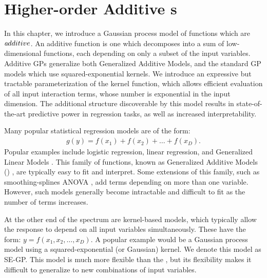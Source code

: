 
\inbpdocument



\chapter{Higher-order Additive \sgp{}s}
\label{ch:additive}








In this chapter, we introduce a Gaussian process model of functions which are $\textit additive$.
An additive function is one which decomposes into a sum of low-dimensional functions, each depending on only a subset of the input variables.
Additive GPs generalize both Generalized Additive Models, and the standard GP models which use squared-exponential kernels.
We introduce an expressive but tractable parameterization of the kernel function, which allows efficient evaluation of all input interaction terms, whose number is exponential in the input dimension.
The additional structure discoverable by this model results in state-of-the-art predictive power in regression tasks, as well as increased interpretability.

Many popular statistical regression models are of the form:
%
\begin{align}
g(y) = f(x_1) + f(x_2) + \dots + f(x_D).
\end{align}
%
Popular examples include logistic regression, linear regression, and Generalized Linear Models \citep{nelder1972generalized}.
This family of functions, known as Generalized Additive Models (\GAM{}) \citep{hastie1990generalized}, are typically easy to fit and interpret.
Some extensions of this family, such as smoothing-splines ANOVA \citep{wahba1990spline}, add terms depending on more than one variable.
However, such models generally become intractable and difficult to fit as the number of terms increases.

At the other end of the spectrum are kernel-based models, which typically allow the response to depend on all input variables simultaneously.
These have the form: $y = f(x_1, x_2, \dots, x_D)$.
A popular example would be a Gaussian process model using a squared-exponential (or Gaussian) kernel.
We denote this model as SE-GP.
This model is much more flexible than the \GAM{}, but its flexibility makes it difficult to generalize to new combinations of input variables.

